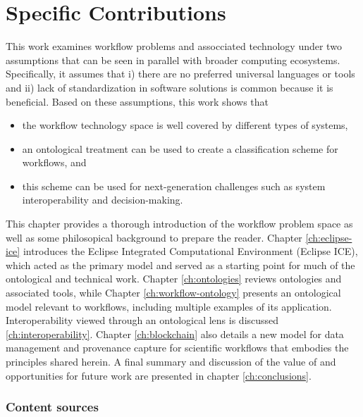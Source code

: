 \section{Specific Contributions}

This work examines workflow problems and assocciated technology under two
assumptions that can be seen in parallel with broader
computing ecosystems. Specifically, it assumes that i) there are no preferred
universal languages or tools and ii) lack of standardization
in software solutions is common because it is beneficial. Based
on these assumptions, this work shows that 
\begin{itemize}
  \item the workflow technology space is well covered by different types
  of systems,
  \item an ontological treatment can be used to create a classification scheme
  for workflows, and
  \item this scheme can be used for next-generation challenges such as system
  interoperability and decision-making.
\end{itemize}

This chapter provides a thorough introduction of the workflow problem space as
well as some philosopical background to prepare the reader. Chapter
\ref{ch:eclipse-ice} introduces the Eclipse Integrated Computational Environment
(Eclipse ICE), which acted as the primary model and served as a starting point
for much of the ontological and technical work. Chapter \ref{ch:ontologies}
reviews ontologies and associated tools, while Chapter
\ref{ch:workflow-ontology} presents an ontological model relevant to workflows,
including multiple examples of its application. Interoperability viewed through
an ontological lens is discussed \ref{ch:interoperability}. Chapter
\ref{ch:blockchain} also details a new model for data management and provenance
capture for scientific workflows that embodies the principles shared herein. A
final summary and discussion of the value of and opportunities for future work
are presented in chapter \ref{ch:conclusions}.

\subsubsection{Content sources}


